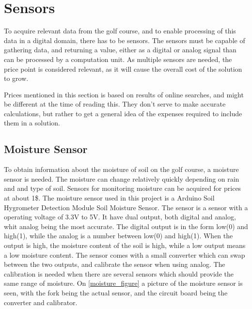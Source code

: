\section{Sensors}
To acquire relevant data from the golf course, and to enable processing of this data in a digital domain, there has to be sensors.
The sensors must be capable of gathering data, and returning a value, either as a digital or analog signal than can be processed by a computation unit.
As multiple sensors are needed, the price point is considered relevant, as it will cause the overall cost of the solution to grow.

Prices mentioned in this section is based on results of online searches, and might be different at the time of reading this.
They don't serve to make accurate calculations, but rather to get a general idea of the expenses required to include them in a solution.

\subsection{Moisture Sensor}
To obtain information about the moisture of soil on the golf course, a moisture sensor is needed.
The moisture can change relatively quickly depending on rain and and type of soil.
Sensors for monitoring moisture can be acquired for prices at about 1\$.
The moisture sensor used in this project is a Arduino Soil Hygrometer Detection Module Soil Moisture Sensor.
The sensor is a sensor with a operating voltage of 3.3V to 5V.
It have dual output, both digital and analog, whit analog being the most accurate.
The digital output is in the form low(0) and high(1), while the analog is a number between low(0) and high(1)\cite{moisture}.
When the output is high, the moisture content of the soil is high, while a low output means a low moisture content.
The sensor comes with a small converter which can swap between the two outputs, and calibrate the sensor when using analog.
The calibration is needed when there are several sensors which should provide the same range of moisture.
On \ref{moisture_figure} a picture of the moisture sensor is seen, with the fork being the actual sensor, and the circuit board being the converter and calibrator. 

